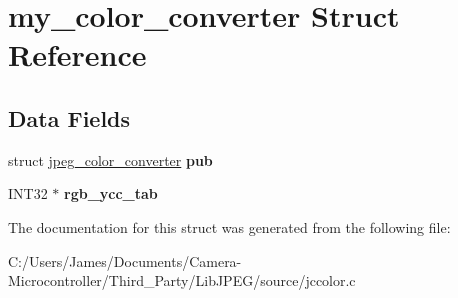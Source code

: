 \hypertarget{structmy__color__converter}{}\section{my\+\_\+color\+\_\+converter Struct Reference}
\label{structmy__color__converter}
\subsection*{Data Fields}
\begin{DoxyCompactItemize}
\item 
\mbox{\label{structmy__color__converter_a127fb19f15e09def8421845aa0bca834}} 
struct \hyperlink{structjpeg__color__converter}{jpeg\+\_\+color\+\_\+converter} {\bfseries pub}
\item 
\mbox{\label{structmy__color__converter_a7a28e14be92cca1eea4b243bf1d2f3e8}} 
I\+N\+T32 $\ast$ {\bfseries rgb\+\_\+ycc\+\_\+tab}
\end{DoxyCompactItemize}


The documentation for this struct was generated from the following file\+:\begin{DoxyCompactItemize}
\item 
C\+:/\+Users/\+James/\+Documents/\+Camera-\/\+Microcontroller/\+Third\+\_\+\+Party/\+Lib\+J\+P\+E\+G/source/jccolor.\+c\end{DoxyCompactItemize}
